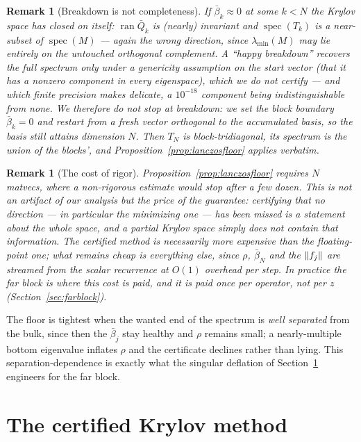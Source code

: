 \documentclass[11pt]{article}
\newtheorem{remark}[theorem]{Remark}
\newcommand{\spec}{\operatorname{spec}}
\DeclarePairedDelimiter{\norm}{\lVert}{\rVert}
\begin{document}
\begin{remark}[Breakdown is not completeness]\label{rem:breakdown}
If $\bar\beta_k\approx0$ at some $k<N$ the Krylov space has closed on itself: $\operatorname{ran}\bar Q_k$
is (nearly) invariant and $\spec(T_k)$ is a near-\emph{subset} of $\spec(M)$ --- again the wrong
direction, since $\lambda_{\min}(M)$ may lie entirely on the untouched orthogonal complement. A
``happy breakdown'' recovers the full spectrum only under a genericity assumption on the start vector
(that it has a nonzero component in every eigenspace), which we do not certify --- and which finite
precision makes delicate, a $10^{-18}$ component being indistinguishable from none. We therefore do not
stop at breakdown: we set the block boundary $\bar\beta_k=0$ and restart from a fresh vector
orthogonal to the accumulated basis, so the basis still attains dimension $N$. Then $T_N$ is
block-tridiagonal, its spectrum is the union of the blocks', and Proposition~\ref{prop:lanczosfloor}
applies verbatim.
\end{remark}

\begin{remark}[The cost of rigor]\label{rem:cost}
Proposition~\ref{prop:lanczosfloor} requires $N$ matvecs, where a non-rigorous estimate would stop
after a few dozen. This is not an artifact of our analysis but the price of the guarantee: certifying
that \emph{no} direction --- in particular the minimizing one --- has been missed is a statement about
the whole space, and a partial Krylov space simply does not contain that information. The certified
method is necessarily more expensive than the floating-point one; what remains cheap is everything
\emph{else}, since $\rho$, $\bar\beta_N$ and the $\norm{f_j}$ are streamed from the scalar recurrence
at $O(1)$ overhead per step. In practice the far block is where this cost is paid, and it is paid once
per operator, not per $z$ (Section~\ref{sec:farblock}).
\end{remark}

The floor is tightest when the wanted end of the spectrum is \emph{well separated} from the bulk, since
then the $\bar\beta_j$ stay healthy and $\rho$ remains small; a nearly-multiple bottom eigenvalue
inflates $\rho$ and the certificate declines rather than lying. This separation-dependence is exactly
what the singular deflation of Section~\ref{sec:krylov} engineers for the far block.

\section{The certified Krylov method}\label{sec:krylov}
\end{document}
